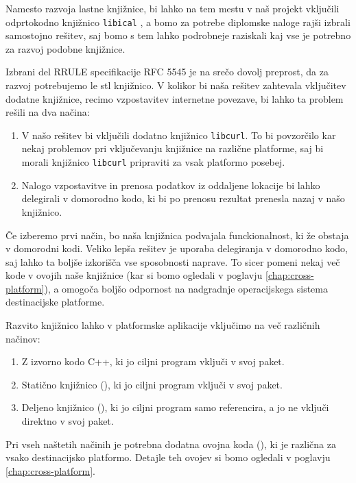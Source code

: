 Namesto razvoja lastne knjižnice, bi lahko na tem mestu v naš projekt vključili odprtokodno knjižnico \texttt{libical} \cite{libical}, a bomo za potrebe diplomske naloge rajši izbrali samostojno rešitev, saj bomo s tem lahko podrobneje raziskali kaj vse je potrebno za razvoj podobne knjižnice.

Izbrani del RRULE specifikacije RFC 5545 je na srečo dovolj preprost, da za razvoj potrebujemo le \gls{stl} knjižnico. V kolikor bi naša rešitev zahtevala vključitev dodatne knjižnice, recimo vzpostavitev internetne povezave, bi lahko ta problem rešili na dva načina:

\begin{enumerate}
  \item V našo rešitev bi vključili dodatno knjižnico \texttt{libcurl}. To bi povzorčilo kar nekaj problemov pri vključevanju knjižnice na različne platforme, saj bi morali knjižnico \texttt{libcurl} pripraviti za vsak platformo posebej.
  \item Nalogo vzpostavitve in prenosa podatkov iz oddaljene lokacije bi lahko delegirali v domorodno kodo, ki bi po prenosu rezultat prenesla nazaj v našo knjižnico.
\end{enumerate}

Če izberemo prvi način, bo naša knjižnica podvajala funckionalnost, ki že obstaja v domorodni kodi. Veliko lepša rešitev je uporaba delegiranja v domorodno kodo, saj lahko ta boljše izkorišča vse sposobnosti naprave. To sicer pomeni nekaj več kode v ovojih naše knjižnice (kar si bomo ogledali v poglavju \ref{chap:cross-platform}), a omogoča boljšo odpornost na nadgradnje operacijskega sistema destinacijske platforme.

Razvito knjižnico lahko v platformske aplikacije vključimo na več različnih načinov:

\begin{enumerate}
  \item Z izvorno kodo C++, ki jo ciljni program vključi v svoj paket.
  \item Statično knjižnico (), ki jo ciljni program vključi v svoj paket.
  \item Deljeno knjižnico (), ki jo ciljni program samo referencira, a jo ne vključi direktno v svoj paket.
\end{enumerate}

Pri vseh naštetih načinih je potrebna dodatna ovojna koda (), ki je različna za vsako destinacijsko platformo. Detajle teh ovojev si bomo ogledali v poglavju \ref{chap:cross-platform}.

